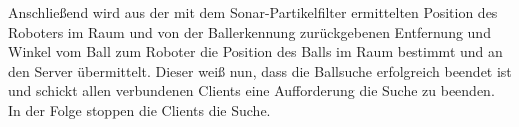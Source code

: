 Anschließend wird aus der mit dem Sonar-Partikelfilter ermittelten
Position des Roboters im Raum und von der Ballerkennung zurückgebenen
Entfernung und Winkel vom Ball zum Roboter die Position des Balls im
Raum bestimmt und an den Server übermittelt. Dieser weiß nun, dass die
Ballsuche erfolgreich beendet ist und schickt allen verbundenen
Clients eine Aufforderung die Suche zu beenden. In der Folge stoppen
die Clients die Suche.

